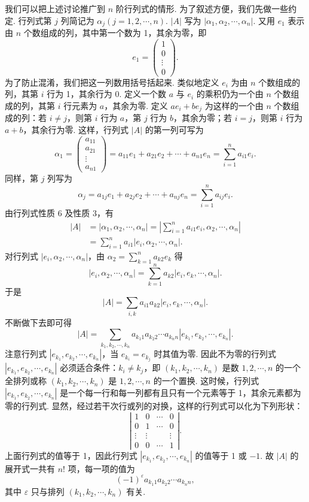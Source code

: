 \documentclass[UTF8, 12pt, fontset=fandol, oneside]{ctexart}
\begin{document}
我们可以把上述讨论推广到 $n$ 阶行列式的情形. 为了叙述方便，我们先做一些约定. 行列式第 $j$ 列简记为 $\alpha_j(j=1,2,\cdots,n)$. $|A|$ 写为 $|\alpha_1,\alpha_2,\cdots,\alpha_n|$. 又用 $e_1$ 表示由 $n$ 个数组成的列，其中第一个数为 1，其余为零，即
\[
e_1=\left(\begin{array}{c}
1\\
0\\
\vdots\\
0
\end{array}\right).
\]
为了防止混淆，我们把这一列数用括号括起来. 类似地定义 $e_i$ 为由 $n$ 个数组成的列，其第 $i$ 行为 1，其余行为 0. 定义一个数 $a$ 与 $e_i$ 的乘积仍为一个由 $n$ 个数组成的列，其第 $i$ 行元素为 $a$，其余为零. 定义 $ae_i+be_j$ 为这样的一个由 $n$ 个数组成的列：若 $i\ne j$，则第 $i$ 行为 $a$，第 $j$ 行为 $b$，其余为零；若 $i=j$，则第 $i$ 行为 $a+b$，其余行为零. 这样，行列式 $|A|$ 的第一列可写为
\[
\alpha_1=
\left(\begin{array}{c}
a_{11}\\
a_{21}\\
\vdots\\
a_{n1}
\end{array}\right)
=a_{11}e_1+a_{21}e_2+\cdots+a_{n1}e_n
=\sum_{i=1}^n a_{i1}e_i.
\]
同样，第 $j$ 列写为
\[
\alpha_j=a_{1j}e_1+a_{2j}e_2+\cdots+a_{nj}e_n
=\sum_{i=1}^n a_{ij}e_i.
\]
由行列式性质 6 及性质 3，有
\[
\begin{aligned}
|A|
&=|\alpha_1,\alpha_2,\cdots,\alpha_n|
=\left|\sum_{i=1}^n a_{i1}e_i,\alpha_2,\cdots,\alpha_n\right|\\
&=\sum_{i=1}^n a_{i1}|e_i,\alpha_2,\cdots,\alpha_n|.
\end{aligned}
\]
对行列式 $|e_i,\alpha_2,\cdots,\alpha_n|$，由 $\alpha_2=\sum_{k=1}^n a_{k2}e_k$ 得
\[
|e_i,\alpha_2,\cdots,\alpha_n|
=\sum_{k=1}^n a_{k2}|e_i,e_k,\cdots,\alpha_n|.
\]
于是
\[
|A|=\sum_{i,k}a_{i1}a_{k2}|e_i,e_k,\cdots,\alpha_n|.
\]
不断做下去即可得
\[
|A|=\sum_{k_1,k_2,\cdots,k_n}
a_{k_1 1}a_{k_2 2}\cdots a_{k_n n}
|e_{k_1},e_{k_2},\cdots,e_{k_n}|.
\]
注意行列式 $|e_{k_1},e_{k_2},\cdots,e_{k_n}|$，当 $e_{k_i}=e_{k_j}$ 时其值为零. 因此不为零的行列式 $|e_{k_1},e_{k_2},\cdots,e_{k_n}|$ 必须适合条件：$k_i\ne k_j$，即 $(k_1,k_2,\cdots,k_n)$ 是数 $1,2,\cdots,n$ 的一个全排列或称 $(k_1,k_2,\cdots,k_n)$ 是 $1,2,\cdots,n$ 的一个置换. 这时候，行列式 $|e_{k_1},e_{k_2},\cdots,e_{k_n}|$ 是一个每一行和每一列都有且只有一个元素等于 1，其余元素都为零的行列式. 显然，经过若干次行或列的对换，这样的行列式可以化为下列形状：
\[
\left|\begin{array}{cccc}
1 & 0 & \cdots & 0\\
0 & 1 & \cdots & 0\\
\vdots & \vdots & & \vdots\\
0 & 0 & \cdots & 1
\end{array}\right|.
\]
上面行列式的值等于 1，因此行列式 $|e_{k_1},e_{k_2},\cdots,e_{k_n}|$ 的值等于 1 或 $-1$. 故 $|A|$ 的展开式一共有 $n!$ 项，每一项的值为
\[
(-1)^\varepsilon a_{k_1 1}a_{k_2 2}\cdots a_{k_n n},
\]
其中 $\varepsilon$ 只与排列 $(k_1,k_2,\cdots,k_n)$ 有关.
\end{document}
